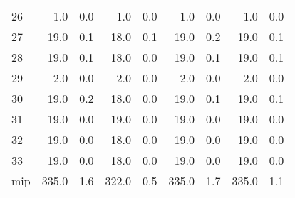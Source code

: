 \begin{tabular}{lrrrrrrrr}
26 & 1.0 & 0.0 & 1.0 & 0.0 & 1.0 & 0.0 & 1.0 & 0.0 \\
27 & 19.0 & 0.1 & 18.0 & 0.1 & 19.0 & 0.2 & 19.0 & 0.1 \\
28 & 19.0 & 0.1 & 18.0 & 0.0 & 19.0 & 0.1 & 19.0 & 0.1 \\
29 & 2.0 & 0.0 & 2.0 & 0.0 & 2.0 & 0.0 & 2.0 & 0.0 \\
30 & 19.0 & 0.2 & 18.0 & 0.0 & 19.0 & 0.1 & 19.0 & 0.1 \\
31 & 19.0 & 0.0 & 19.0 & 0.0 & 19.0 & 0.0 & 19.0 & 0.0 \\
32 & 19.0 & 0.0 & 18.0 & 0.0 & 19.0 & 0.0 & 19.0 & 0.0 \\
33 & 19.0 & 0.0 & 18.0 & 0.0 & 19.0 & 0.0 & 19.0 & 0.0 \\
mip & 335.0 & 1.6 & 322.0 & 0.5 & 335.0 & 1.7 & 335.0 & 1.1 \\
\bottomrule
\end{tabular}
